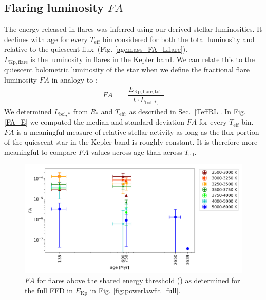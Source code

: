 \documentclass{aa}
\begin{document}
\subsection{Flaring luminosity $FA$}
The energy released in flares was inferred using our derived stellar luminosities. It declines with age for every $T_\mathrm{eff}$ bin considered for both the total luminosity and relative to the quiescent flux~(Fig. \ref{agemass_FA_Lflare}).
\\
$L_\mathrm{Kp,flare}$ is the luminosity in flares in the Kepler band. We can relate this to the quiescent bolometric luminosity of the star when we define the fractional flare luminosity $FA$ in analogy to :
\begin{align}
\label{FA}
FA&=\dfrac{E_\mathrm{Kp,flare,tot,}}{t\cdot L_{\mathrm{bol,*,}}}
\end{align}
We determined $L_\mathrm{bol,*}$ from $R_*$ and $T_\mathrm{eff}$, as described in Sec.~\ref{TeffRL}. In Fig. \ref{FA_E} we computed the median and standard deviation $FA$ for every $T_\mathrm{eff}$ bin. $FA$ is a meaningful measure of relative stellar activity as long as the flux portion of the quiescent star in the Kepler band is roughly constant. It is therefore more meaningful to compare $FA$ values across age than across $T_\mathrm{eff}$.

\begin{figure}
    \centering
    \includegraphics[width=13.5cm]{pics/FA/FA_T_age_Ethresh.png}
    \caption{$FA$ for flares above the shared energy threshold () as determined for the full FFD in $E_\mathrm{Kp}$ in Fig. \ref{fig:powerlawfit_full}.}          
    \label{fig:FA}
\end{figure}
\end{document}
